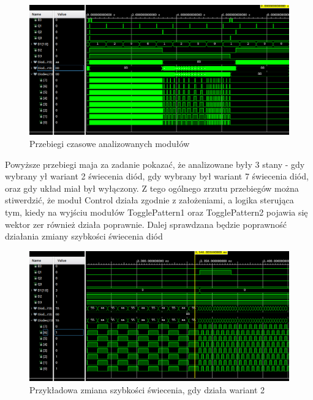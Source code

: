 \documentclass{article}
\begin{document}
\begin{figure} [H]
	\begin{center}
			\includegraphics[width = \textwidth]{test2.png}
			\caption{Przebiegi czasowe analizowanych modułów}
\end{center}
\end{figure}
Powyższe przebiegi maja za zadanie pokazać, że analizowane były 3 stany - gdy wybrany ył wariant 2 świecenia diód, gdy wybrany był wariant 7 świecenia diód, oraz gdy układ miał był wyłączony. 
Z tego ogólnego zrzutu przebiegów można stiwerdzić, że moduł Control działa zgodnie z założeniami, a logika sterująca tym, kiedy na wyjściu modułów TogglePattern1 oraz TogglePattern2 pojawia się wektor zer również działa poprawnie.
Dalej sprawdzana będzie poprawność działania zmiany szybkości świecenia diód
\begin{figure} [H]
	\begin{center}
			\includegraphics[width = \textwidth]{zmiana1.png}
			\caption{Przykładowa zmiana szybkości świecenia, gdy działa wariant 2}
\end{center}
\end{figure}
\end{document}
